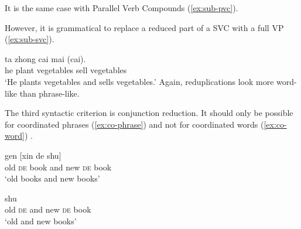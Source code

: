\ea\label{ex:sub-redup}
    
  \z
\z

It is the same case with Parallel Verb Compounds (\ref{ex:sub-pvc}).

\label{ex:sub-pvc}
\z

However, it is grammatical to replace a reduced part of a {SVC} with a full VP (\ref{ex:sub-svc}).

\ea\label{ex:sub-svc}
\gll ta zhong cai mai (cai).\\
 he plant vegetables sell vegetables\\
\glt `He plants vegetables and sells vegetables.'
 \z
Again, reduplications look more word-like than phrase-like.


The third syntactic criterion is conjunction reduction. It should only be possible for coordinated phrases (\ref{ex:co-phrase}) and not for coordinated words (\ref{ex:co-word}) \citetext{\citealp[137]{Duanmu1998}; \citealp[283]{Schaefer2009}}.

\settowidth{}

\ea\label{ex:co-phrase}
  \ea {} gen [xin de shu]\\
  old \textsc{de} book and new \textsc{de} book\\ 
  \glt `old books and new books'
  
  \ex {} shu\\
  old \textsc{de} and new \textsc{de} book\\ 
  \glt `old and new books'
   \z
\z

\ea\label{ex:co-word}
  

